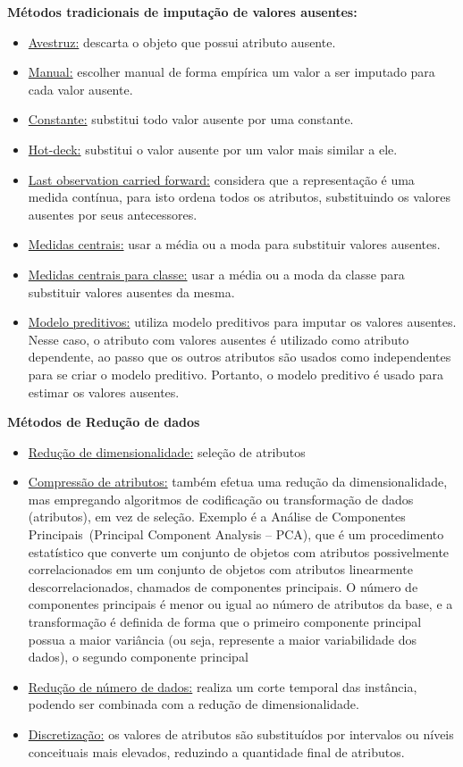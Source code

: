 \textbf{Métodos tradicionais de imputação de valores ausentes:}
\begin{itemize}
	\item \underline{Avestruz:}
		descarta o objeto que possui atributo ausente.
	\item \underline{Manual:}
		escolher manual de forma empírica um valor a ser imputado para cada valor ausente.
	\item \underline{Constante:}
		substitui todo valor ausente por uma constante.
	\item \underline{Hot-deck:}
		substitui o valor ausente por um valor mais similar a ele.
	\item \underline{Last observation carried forward:}
		considera que a representação é uma medida contínua, para isto ordena todos os atributos, substituindo os valores ausentes por seus antecessores.
	\item \underline{Medidas centrais:}
		usar a média ou a moda para substituir valores ausentes.
	\item \underline{Medidas centrais para classe:}
		usar a média ou a moda da classe para substituir valores ausentes da mesma.
	\item \underline{Modelo preditivos:}
		utiliza modelo preditivos para imputar os valores ausentes.
		Nesse caso, o atributo com valores ausentes é utilizado como atributo dependente, ao passo que os outros atributos são usados como independentes para se criar o modelo preditivo.
		Portanto, o modelo preditivo é usado para estimar os valores ausentes.
\end{itemize}


\textbf{Métodos de Redução de dados}
\begin{itemize}
	\item \underline{Redução de dimensionalidade:}
		seleção de atributos
	\item \underline{Compressão de atributos:}
		também efetua uma redução da dimensionalidade, mas empregando algoritmos de codificação ou transformação de dados (atributos), em vez de seleção.
		Exemplo é a Análise de Componentes Principais~(Principal Component Analysis – PCA), que é um procedimento estatístico que converte um conjunto de objetos com atributos possivelmente correlacionados em um conjunto de objetos com atributos linearmente descorrelacionados, chamados de componentes principais.
		O número de componentes principais é menor ou igual ao número de atributos da base, e a transformação é definida de forma que o primeiro componente principal possua a maior variância (ou seja, represente a maior variabilidade dos dados), o segundo componente principal
	\item \underline{Redução de número de dados:}
		realiza um corte temporal das instância, podendo ser combinada com a redução de dimensionalidade.
	\item \underline{Discretização:}
		os valores de atributos são substituídos por intervalos ou níveis conceituais mais elevados, reduzindo a quantidade final de atributos.
\end{itemize}


